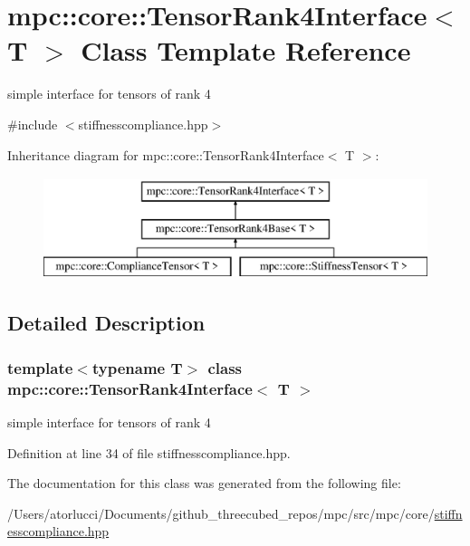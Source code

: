 \hypertarget{structmpc_1_1core_1_1_tensor_rank4_interface}{}\section{mpc\+:\+:core\+:\+:Tensor\+Rank4\+Interface$<$ T $>$ Class Template Reference}
\label{structmpc_1_1core_1_1_tensor_rank4_interface}


simple interface for tensors of rank 4  




{\ttfamily \#include $<$stiffnesscompliance.\+hpp$>$}

Inheritance diagram for mpc\+:\+:core\+:\+:Tensor\+Rank4\+Interface$<$ T $>$\+:\begin{figure}[H]
\begin{center}
\leavevmode
\includegraphics[height=3.000000cm]{structmpc_1_1core_1_1_tensor_rank4_interface}
\end{center}
\end{figure}


\subsection{Detailed Description}
\subsubsection*{template$<$typename T$>$\newline
class mpc\+::core\+::\+Tensor\+Rank4\+Interface$<$ T $>$}

simple interface for tensors of rank 4 

Definition at line 34 of file stiffnesscompliance.\+hpp.



The documentation for this class was generated from the following file\+:\begin{DoxyCompactItemize}
\item 
/\+Users/atorlucci/\+Documents/github\+\_\+threecubed\+\_\+repos/mpc/src/mpc/core/\mbox{\hyperlink{stiffnesscompliance_8hpp}{stiffnesscompliance.\+hpp}}\end{DoxyCompactItemize}
